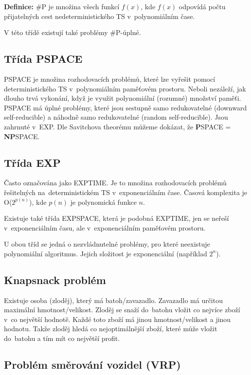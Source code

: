 \textbf{Definice:} \#P je množina všech funkcí $f(x)$, kde $f(x)$ odpovídá počtu přijatelných cest nedeterministického TS v~polynomiálním čase.

\noindent V této třídě existují také problémy \#P-úplné.

\subsection{Třída PSPACE}

PSPACE je množina rozhodovacích problémů, které lze vyřešit pomocí deterministického TS v~polynomiálním paměťovém prostoru.
Neboli nezáleží, jak dlouho trvá vykonání, když je využit polynomiální (rozumné) množství paměťi. 
PSPACE má úplné problémy, které jsou sestupně samo redukovatelné (downward self-reducible) a náhodně samo redukovatelné (random self-reducible).
Jsou zahrnuté v~EXP.
Dle Savitchova theorému můžeme dokázat, že \textbf{P}SPACE = \textbf{NP}SPACE.

\subsection{Třída EXP}

Často označována jako EXPTIME.
Je to množina rozhodovacích problémů řešitelných na~deterministickém TS v~exponenciálním čase.
Časová komplexita je O($2^{p(n)}$), kde $p(n)$ je polynomická funkce $n$.

Existuje také třída EXPSPACE, která je podobná EXPTIME, jen se neřeší v~exponenciálním času, ale v~exponenciálním paměťovém prostoru.

U obou tříd se jedná o nezvládnutelné problémy, pro které neexistuje polynomiální algoritmus.
Jejich složitost je exponenciální (například $2^n$).

\subsection{Knapsnack problém}

Existuje osoba (zloděj), který má batoh/zavazadlo.
Zavazadlo má určitou maximální hmotnost/velikost.
Zloděj se snaží do~batohu vložit co nejvíce zboží v~co největší hodnotě. 
Každé toto zboží má jinou hmotnost/velikost a jinou hodnotu.
Takže zloděj hledá co nejoptimálnější zboží, které může vložit do~batohu a tím mít co největší profit.

\subsection{Problém směrování vozidel (VRP)}

